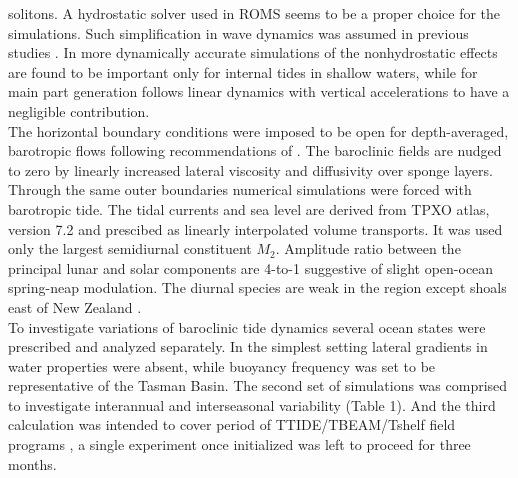 \documentclass[12pt]{article}
\begin{document}
solitons. A hydrostatic solver used in ROMS seems to be a proper choice for the simulations. Such 
simplification in wave dynamics was assumed in previous studies \citep{carter2008energetics, 
merrifield2001generation,  merrifield2002model, kerry2013effects}. In more dynamically accurate   
simulations of \citep{kang2012energetics, zhang2011three} the nonhydrostatic effects are found to 
be important only for internal tides in shallow waters, while for main part generation follows 
linear dynamics with vertical accelerations to have a negligible contribution.\\
The horizontal boundary conditions were imposed to be open for depth-averaged, barotropic flows 
following recommendations of \citep{marchesiello2001open}. The baroclinic fields are 
nudged to zero by linearly increased lateral viscosity and diffusivity over sponge layers. Through 
the same outer boundaries numerical simulations were forced with barotropic tide. The tidal 
currents and sea level are derived from TPXO atlas, version 7.2 \citep{egbert2002efficient} and 
prescibed as linearly interpolated volume transports. It was used only the largest semidiurnal 
constituent $M_2$. Amplitude ratio between the principal lunar and solar components are 4-to-1 
suggestive of slight open-ocean spring-neap modulation. The diurnal species are weak in the region 
except shoals east of New Zealand \citep{walters2001ocean}.\\
To investigate variations of baroclinic tide dynamics several ocean states were prescribed and 
analyzed separately. In the simplest setting lateral gradients in water properties were absent, 
while buoyancy frequency was set to be representative of the Tasman Basin. The second set of 
simulations 
was comprised to investigate interannual and interseasonal variability (Table 1). And the third 
calculation was intended to cover period of TTIDE/TBEAM/Tshelf field programs 
\citep{pinkel2015breaking}, a single experiment once initialized was left to proceed for three 
months.
\end{document}
